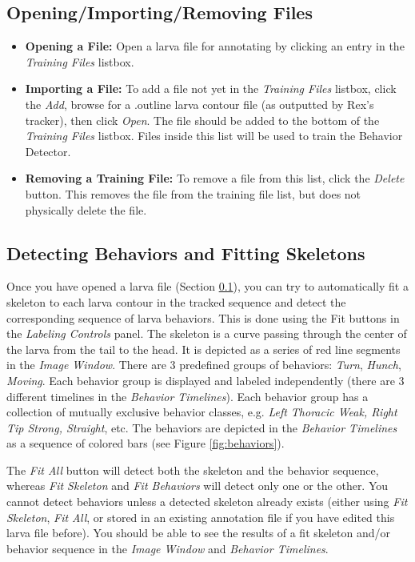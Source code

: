 \documentclass[10pt, onecolumn]{article}
\newcommand{\1}{\textbf{1}}
\begin{document}
\subsection{Opening/Importing/Removing Files}
\label{sec:open}
\begin{itemize}
 \item \textbf{Opening a File:} Open a larva file for annotating by clicking an entry in the \textit{Training Files} listbox.
 \item \textbf{Importing a File:} To add a file not yet in the \textit{Training Files} listbox, click the \textit{Add}, browse for a .outline larva contour file (as outputted by Rex's tracker), then click \textit{Open}.  The file should be added to the bottom of the \textit{Training Files} listbox.  Files inside this list will be used to train the Behavior Detector.  
 \item \textbf{Removing a Training File:} To remove a file from this list, click the \textit{Delete} button.  This removes the file from the training file list, but does not physically delete the file.
\end{itemize}

\subsection{Detecting Behaviors and Fitting Skeletons}
\label{sec:detect}
Once you have opened a larva file (Section \ref{sec:open}), you can try to automatically fit a skeleton to each larva contour in the tracked sequence and detect the corresponding sequence of larva behaviors.  This is done using the Fit buttons in the \textit{Labeling Controls} panel.  The skeleton is a curve passing through the center of the larva from the tail to the head.  It is depicted as a series of red line segments in the \textit{Image Window}.  There are 3 predefined groups of behaviors: \textit{Turn}, \textit{Hunch}, \textit{Moving}.  Each behavior group is displayed and labeled independently (there are 3 different timelines in the \textit{Behavior Timelines}).  Each behavior group has a collection of mutually exclusive behavior classes, e.g. \textit{Left Thoracic Weak, Right Tip Strong, Straight}, etc.  The behaviors are depicted in the \textit{Behavior Timelines} as a sequence of colored bars (see Figure \ref{fig:behaviors}).

The \textit{Fit All} button will detect both the skeleton and the behavior sequence, whereas \textit{Fit Skeleton} and \textit{Fit Behaviors} will detect only one or the other.  You cannot detect behaviors unless a detected skeleton already exists (either using \textit{Fit Skeleton}, \textit{Fit All}, or stored in an existing annotation file if you have edited this larva file before).  You should be able to see the results of a fit skeleton and/or behavior sequence in the \textit{Image Window} and \textit{Behavior Timelines}.
\end{document}

